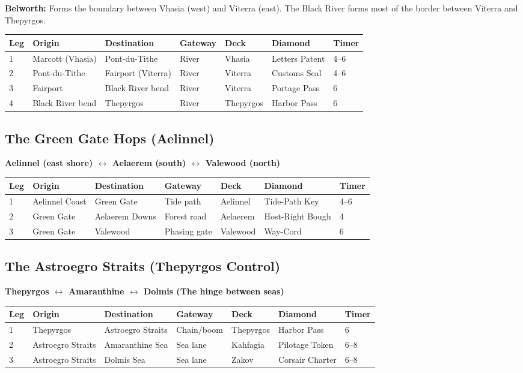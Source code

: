 \documentclass[11pt,letterpaper,twoside]{book}
\begin{document}
\textbf{Belworth:} Forms the boundary between Vhasia (west) and Viterra (east). The Black River forms most of the border between Viterra and Thepyrgos.

\begin{longtable}{|p{1.5cm}|p{2.5cm}|p{2.5cm}|p{1.5cm}|p{2cm}|p{1.5cm}|}
\hline
\textbf{Leg} & \textbf{Origin} & \textbf{Destination} & \textbf{Gateway} & \textbf{Deck} & \textbf{Diamond} & \textbf{Timer} \\
 & Marcott (Vhasia) & Pont-du-Tithe & River & Vhasia & Letters Patent & 4--6 \\
2 & Pont-du-Tithe & Fairport (Viterra) & River & Viterra & Customs Seal & 4--6 \\
3 & Fairport & Black River bend & River & Viterra & Portage Pass & 6 \\
4 & Black River bend & Thepyrgos & River & Thepyrgos & Harbor Pass & 6 \\
\hline
\end{longtable}

\subsection{The Green Gate Hops (Aelinnel)}

\textbf{Aelinnel (east shore) $\leftrightarrow$ Aelaerem (south) $\leftrightarrow$ Valewood (north)}

\begin{longtable}{|p{1.5cm}|p{2.5cm}|p{2.5cm}|p{1.5cm}|p{2cm}|p{1.5cm}|}
\hline
\textbf{Leg} & \textbf{Origin} & \textbf{Destination} & \textbf{Gateway} & \textbf{Deck} & \textbf{Diamond} & \textbf{Timer} \\
 & Aelinnel Coast & Green Gate & Tide path & Aelinnel & Tide-Path Key & 4--6 \\
2 & Green Gate & Aelaerem Downs & Forest road & Aelaerem & Host-Right Bough & 4 \\
3 & Green Gate & Valewood & Phasing gate & Valewood & Way-Cord & 6 \\
\hline
\end{longtable}

\subsection{The Astroegro Straits (Thepyrgos Control)}

\textbf{Thepyrgos $\leftrightarrow$ Amaranthine $\leftrightarrow$ Dolmis (The hinge between seas)}

\begin{longtable}{|p{1.5cm}|p{2.5cm}|p{2.5cm}|p{1.5cm}|p{2cm}|p{1.5cm}|}
\hline
\textbf{Leg} & \textbf{Origin} & \textbf{Destination} & \textbf{Gateway} & \textbf{Deck} & \textbf{Diamond} & \textbf{Timer} \\
 & Thepyrgos & Astroegro Straits & Chain/boom & Thepyrgos & Harbor Pass & 6 \\
2 & Astroegro Straits & Amaranthine Sea & Sea lane & Kahfagia & Pilotage Token & 6--8 \\
3 & Astroegro Straits & Dolmis Sea & Sea lane & Zakov & Corsair Charter & 6--8 \\
\hline
\end{longtable}
\end{document}
